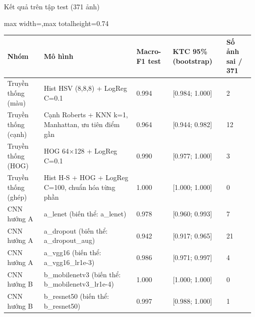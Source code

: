 \documentclass[aspectratio=169,10pt]{beamer}
\begin{document}
\begin{frame}{Kết quả trên tập test (371 ảnh)}
\begin{center}\begin{adjustbox}{max width=\linewidth,max totalheight=0.74\textheight}
\begin{tabular}{>{\raggedright\arraybackslash}p{2.7cm} >{\raggedright\arraybackslash}p{5.6cm} l l l}\toprule
\textbf{Nhóm} & \textbf{Mô hình} & \textbf{Macro-F1 test} & \textbf{KTC 95\% (bootstrap)} & \textbf{Số ảnh sai / 371} \\ \midrule
Truyền thống (màu) & Hist HSV (8,8,8) + LogReg C=0.1 & 0.994 & [0.984; 1.000] & 2 \\
Truyền thống (cạnh) & Cạnh Roberts + KNN k=1, Manhattan, ưu tiên điểm gần & 0.964 & [0.944; 0.982] & 12 \\
Truyền thống (HOG) & HOG 64$\times$128 + LogReg C=0.1 & 0.990 & [0.977; 1.000] & 3 \\
Truyền thống (ghép) & Hist H-S + HOG + LogReg C=100, chuẩn hóa từng phần & 1.000 & [1.000; 1.000] & 0 \\
CNN hướng A & a\_lenet (biến thể: a\_lenet) & 0.978 & [0.960; 0.993] & 7 \\
CNN hướng A & a\_dropout (biến thể: a\_dropout\_aug) & 0.942 & [0.917; 0.965] & 21 \\
CNN hướng A & a\_vgg16 (biến thể: a\_vgg16\_lr1e-3) & 0.986 & [0.971; 0.997] & 4 \\
CNN hướng B & b\_mobilenetv3 (biến thể: b\_mobilenetv3\_lr1e-4) & 1.000 & [1.000; 1.000] & 0 \\
CNN hướng B & b\_resnet50 (biến thể: b\_resnet50) & 0.997 & [0.988; 1.000] & 1 \\
\bottomrule\end{tabular}
\end{adjustbox}\end{center}
\end{frame}
\end{document}
